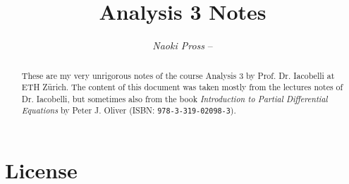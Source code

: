 \documentclass[margin=normal]{tex/hsrzf}
\author{\textsl{Naoki Pross} -- \texttt{\theauthoremail}}
\title{Analysis 3 Notes}
\date{\thesemester}
\begin{document}

\maketitle

\begin{abstract}
  These are my very unrigorous notes of the course Analysis 3 by Prof. Dr.
  Iacobelli at ETH Zürich. The content of this document was taken mostly from
  the lectures notes of Dr. Iacobelli, but sometimes also from the book
  \textit{Introduction to Partial Differential Equations} by Peter J. Oliver
  (ISBN: \texttt{978-3-319-02098-3}).
\end{abstract}


\section*{License}
\doclicenseThis

\tableofcontents


\clearpage
\twocolumn 
\setcounter{page}{1}






\appendix


\end{document}
